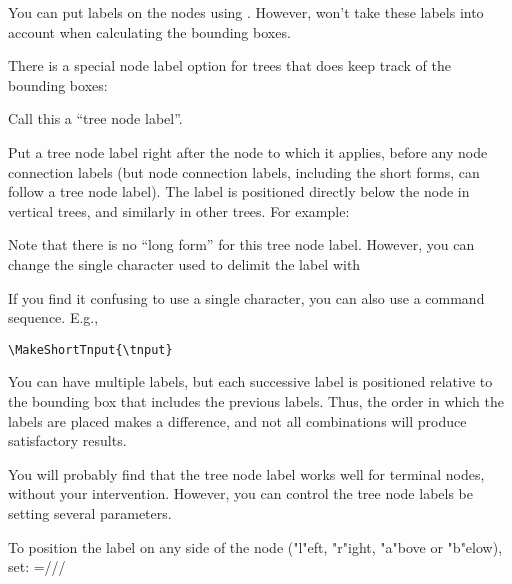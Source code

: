 \documentclass[11pt,english,BCOR10mm,DIV12,bibliography=totoc,parskip=false,smallheadings
    headexclude,footexclude,oneside]{pst-doc}
\begin{document}
You can put labels on the nodes using . However,  won't take
these labels into account when calculating the bounding boxes.

There is a special node label option for trees that does keep track of the
bounding boxes:
\begin{BDef}
\Lnotation{\texttildelow}\OptArg*{*}\OptArgs{}
\end{BDef}
Call this a ``tree node label''.

Put a tree node label right after the node to which it applies, before any
node connection labels (but node connection labels, including the short forms,
can follow a tree node label). The label is positioned directly below the node
in vertical trees, and similarly in other trees. For example:


\begin{LTXexample}
\end{LTXexample}

Note that there is no ``long form'' for this tree node label. However, you can
change the single character used to delimit the label with
\begin{BDef}
\end{BDef}
If you find it confusing to use a single character, you can also use a command
sequence. E.g.,

\begin{lstlisting}[style=syntax]
\MakeShortTnput{\tnput}
\end{lstlisting}

You can have multiple labels, but each successive label is positioned relative
to the bounding box that includes the previous labels. Thus, the order in
which the labels are placed makes a difference, and not all combinations will
produce satisfactory results.

You will probably find that the tree node label works well for terminal nodes,
without your intervention. However, you can control the tree node labels be
setting several parameters.

To position the label on any side of the node ("l"eft, "r"ight, "a"bove or
"b"elow), set:  =///

\begin{LTXexample}[pos=l,width=0.4\linewidth]
\end{LTXexample}
\end{document}
